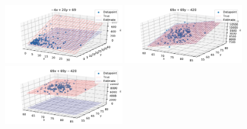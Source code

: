 \documentclass[12pt]{article}
\begin{document}
\begin{figure}[H]
            \includegraphics[width=0.45\textwidth]{f_3_noise3_estplot_regular}
            \includegraphics[width=0.45\textwidth]{f_4_noise3_estplot_ard}
            \includegraphics[width=0.45\textwidth]{f_4_noise3_estplot_regular}
        \end{figure}
\end{document}
